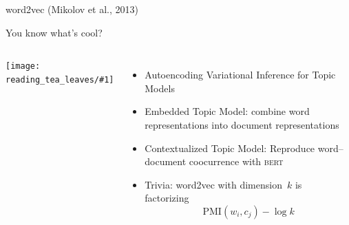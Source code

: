 \documentclass[compress]{beamer}
\newcommand{\abr}[1]{\textsc{#1} }
\newcommand{\fsi}[2]{
\begin{frame}[plain]
\vspace*{-1pt}
\makebox[\linewidth]{\texttt{[image: \#1]}}
\begin{center}
#2
\end{center}
\end{frame}
}
\newcommand{\gfxt}[2]{
\begin{center}
	\texttt{[image: reading\_tea\_leaves/\#1]}
\end{center}
}
\begin{document}
\fsi{general_figures/w2v_flow}{word2vec (Mikolov et al., 2013)}

\begin{frame}{You know what's cool?}

  \begin{columns}
    \gfxt{drake_neural}{.9}
  \begin{itemize}
  \item Autoencoding Variational Inference for Topic Models~\cite{srivastava-17}
    \item Embedded Topic Model: combine word representations into
      document representations~\cite{dieng-20}
    \item Contextualized Topic Model: Reproduce word--document
      coocurrence with \abr{bert}~\cite{bianchi-21}
    \pause
  \item Trivia: word2vec with dimension~$k$ is factorizing~\cite{levy-14}
    \begin{equation}
      \mbox{PMI}(w_i, c_j) - \log k
    \end{equation}
  \end{itemize}

  \end{columns}
\end{frame}
\end{document}
